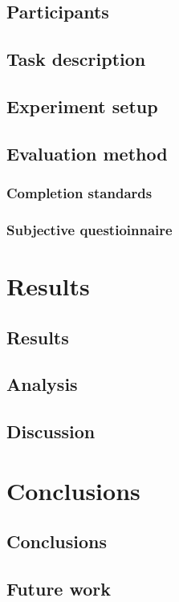 \section{Participants}
\section{Task description}
\section{Experiment setup}
\section{Evaluation method}
  \subsection{Completion standards}
  \subsection{Subjective questioinnaire}

\chapter{Results}
\label{ch:results}
\section{Results}
\section{Analysis}
\section{Discussion}

\chapter{Conclusions}
\label{ch:conclusion}
\section{Conclusions}
\section{Future work}
